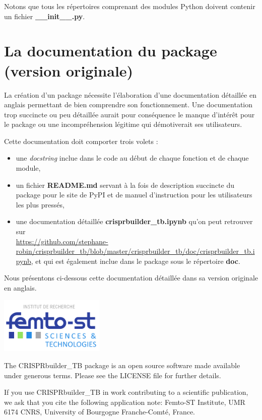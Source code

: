 \documentclass[twoside,a4paper,11pt,frenchb,openany]{report}
\begin{document}
Notons que tous les répertoires comprenant des modules Python doivent contenir un fichier
\textbf{ \_\_init\_\_.py}.



\chapter{La documentation du package \\(version originale)}


La création d'un package nécessite l'élaboration d'une documentation détaillée en anglais permettant de bien comprendre son fonctionnement. Une documentation trop succincte ou peu détaillée aurait pour conséquence le manque d'intérêt pour le package ou une incompréhension légitime qui démotiverait ses utilisateurs.

Cette documentation doit comporter trois volets :
\begin{itemize}
\item une \textit{docstring} inclue dans le code au début de chaque fonction et de chaque module,
\item un fichier \textbf{README.md} servant à la fois de description succincte du package pour le site de PyPI et de manuel d'instruction pour les utilisateurs les plus pressés,
\item une documentation détaillée \textbf{crisprbuilder\_tb.ipynb} qu'on peut retrouver sur \\ \url{https://github.com/stephane-robin/crisprbuilder_tb/blob/master/crisprbuilder_tb/doc/crisprbuilder_tb.ipynb}, et qui est également inclue dans le package sous le répertoire \textbf{doc}.
\end{itemize}   

Nous présentons ci-dessous cette documentation détaillée dans sa version originale en anglais.

\includegraphics[width=5cm]{femto.png}

The CRISPRbuilder\_TB package is an open source software made available
under generous terms. Please see the LICENSE file for further details.

If you use CRISPRbuilder\_TB in work contributing to a scientific
publication, we ask that you cite the following application note:
Femto-ST Institute, UMR 6174 CNRS, University of Bourgogne
Franche-Comté, France.
\end{document}

